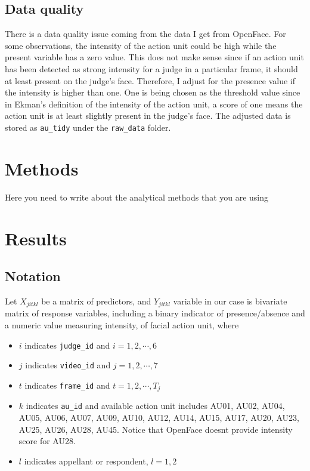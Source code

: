 \documentclass{monashthesis}
\begin{document}
\hypertarget{data-quality}{%
\section{Data quality}\label{data-quality}}

There is a data quality issue coming from the data I get from OpenFace. For some observations, the intensity of the action unit could be high while the present variable has a zero value. This does not make sense since if an action unit has been detected as strong intensity for a judge in a particular frame, it should at least present on the judge's face. Therefore, I adjust for the presence value if the intensity is higher than one. One is being chosen as the threshold value since in Ekman's definition of the intensity of the action unit, a score of one means the action unit is at least slightly present in the judge's face. The adjusted data is stored as \texttt{au\_tidy} under the \texttt{raw\_data} folder.

\hypertarget{methods}{%
\chapter{Methods}\label{methods}}

Here you need to write about the analytical methods that you are using

\hypertarget{results}{%
\chapter{Results}\label{results}}

\hypertarget{notation}{%
\section{Notation}\label{notation}}

Let \(X_{jitkl}\) be a matrix of predictors, and \(Y_{jitkl}\) variable in our case is bivariate matrix of response variables, including a binary indicator of presence/absence and a numeric value measuring intensity, of facial action unit, where

\begin{itemize}
\tightlist
\item
  \(i\) indicates \texttt{judge\_id} and \(i = 1,2, \cdots, 6\)
\item
  \(j\) indicates \texttt{video\_id} and \(j = 1,2, \cdots, 7\)
\item
  \(t\) indicates \texttt{frame\_id} and \(t = 1,2, \cdots, T_j\)
\item
  \(k\) indicates \texttt{au\_id} and available action unit includes AU01, AU02, AU04, AU05, AU06, AU07, AU09, AU10, AU12, AU14, AU15, AU17, AU20, AU23, AU25, AU26, AU28, AU45. Notice that OpenFace doesnt provide intensity score for AU28.
\item
  \(l\) indicates appellant or respondent, \(l=1,2\)
\end{itemize}
\end{document}

